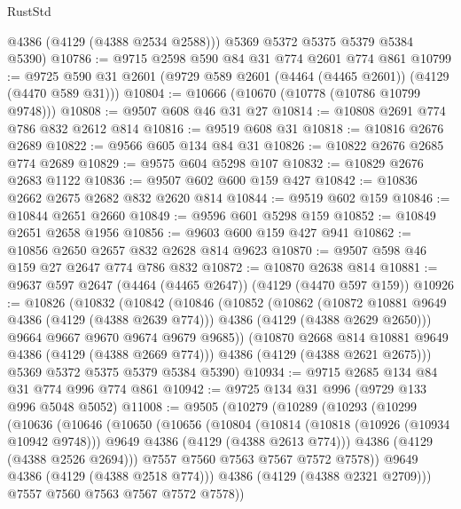 \begin{lexlean}{RustStd}
\begin{coremodule}
{\begin{coremodule}
{{{{{{{{{{{{{{        @4386
        (@4129 (@4388 @2534 @2588)))
      @5369
      @5372
      @5375
      @5379
      @5384
      @5390)
@10786 := @9715 @2598 @590 @84 @31 @774 @2601 @774 @861
@10799 := @9725 @590 @31 @2601 (@9729 @589 @2601 (@4464 (@4465 @2601)) (@4129 (@4470 @589 @31)))
@10804 := @10666 (@10670 (@10778 (@10786 @10799 @9748)))
@10808 := @9507 @608 @46 @31 @27
@10814 := @10808 @2691 @774 @786 @832 @2612 @814
@10816 := @9519 @608 @31
@10818 := @10816 @2676 @2689
@10822 := @9566 @605 @134 @84 @31
@10826 := @10822 @2676 @2685 @774 @2689
@10829 := @9575 @604 @5298 @107
@10832 := @10829 @2676 @2683 @1122
@10836 := @9507 @602 @600 @159 @427
@10842 := @10836 @2662 @2675 @2682 @832 @2620 @814
@10844 := @9519 @602 @159
@10846 := @10844 @2651 @2660
@10849 := @9596 @601 @5298 @159
@10852 := @10849 @2651 @2658 @1956
@10856 := @9603 @600 @159 @427 @941
@10862 := @10856 @2650 @2657 @832 @2628 @814 @9623
@10870 := @9507 @598 @46 @159 @27 @2647 @774 @786 @832
@10872 := @10870 @2638 @814
@10881 := @9637 @597 @2647 (@4464 (@4465 @2647)) (@4129 (@4470 @597 @159))
@10926 := @10826
    (@10832
      (@10842
        (@10846
          (@10852
            (@10862
              (@10872 @10881 @9649 @4386 (@4129 (@4388 @2639 @774)))
              @4386
              (@4129 (@4388 @2629 @2650)))
            @9664
            @9667
            @9670
            @9674
            @9679
            @9685))
        (@10870 @2668 @814 @10881 @9649 @4386 (@4129 (@4388 @2669 @774)))
        @4386
        (@4129 (@4388 @2621 @2675)))
      @5369
      @5372
      @5375
      @5379
      @5384
      @5390)
@10934 := @9715 @2685 @134 @84 @31 @774 @996 @774 @861
@10942 := @9725 @134 @31 @996 (@9729 @133 @996 @5048 @5052)
@11008 := @9505
    (@10279
      (@10289
        (@10293
          (@10299
            (@10636
              (@10646
                (@10650
                  (@10656
                    (@10804
                      (@10814
                        (@10818 (@10926 (@10934 @10942 @9748)))
                        @9649
                        @4386
                        (@4129 (@4388 @2613 @774)))
                      @4386
                      (@4129 (@4388 @2526 @2694)))
                    @7557
                    @7560
                    @7563
                    @7567
                    @7572
                    @7578))
                @9649
                @4386
                (@4129 (@4388 @2518 @774)))
              @4386
              (@4129 (@4388 @2321 @2709)))
            @7557
            @7560
            @7563
            @7567
            @7572
            @7578))
}}}}}}}}}}}}}}
\end{coremodule}}
\end{coremodule}
\end{lexlean}
